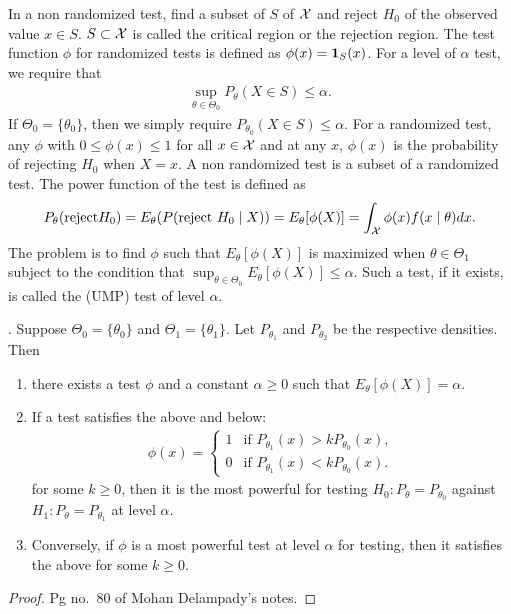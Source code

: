 In a non randomized test, find a subset of $S$ of $\mathcal{X}$ and reject $H_{0}$ of the observed value $x \in S$. $S \subset \mathcal{X}$ is called the critical region or the rejection region. The test function $\phi$ for randomized tests is defined as
$\phi(x) = \textbf{1}_{S}(x)$. For a level of $\alpha$ test, we require that
\begin{align}
    \sup_{\theta \in \Theta_{0}} P_{\theta}(X \in S) \leq \alpha.
\end{align}
If $\Theta_{0} = \{\theta_{0}\}$, then we simply require $P_{\theta_{0}}(X \in S) \leq \alpha$. For a randomized test, any $\phi$ with $0 \leq \phi(x) \leq 1$ for all $x \in \mathcal{X}$ and at any $x$, $\phi(x)$ is the probability of rejecting $H_{0}$ when $X = x$. A non randomized test is a subset of a randomized test. The power function of the test is defined as
\begin{align}
    P_{\theta}(\text{reject} H_{0}) = E_{\theta}(P(\text{reject } H_{0} \mid X)) = E_{\theta}[\phi(X)] = \int_{\mathcal{X}} \phi(x) f(x \mid \theta) dx.
\end{align}
The problem is to find $\phi$ such that $E_{\theta}[\phi(X)]$ is maximized when $\theta \in \Theta_{1}$ subject to the condition that $\sup_{\theta \in \Theta_{0}} E_{\theta}[\phi(X)] \leq \alpha$. Such a test, if it exists, is called the  (UMP) test of level $\alpha$.

\begin{lemma}
    . Suppose $\Theta_{0} = \{\theta_{0}\}$ and $\Theta_{1} = \{\theta_{1}\}$. Let $P_{\theta_{1}}$ and $P_{\theta_{2}}$ be the respective densities. Then
    \begin{enumerate}
        \item there exists a test $\phi$ and a constant $\alpha \geq 0$ such that $E_{\theta}[\phi(X)] = \alpha$.
        \item If a test satisfies the above and below:
        \begin{align}
            \phi(x) = \begin{cases}
                1 &\text{if } P_{\theta_{1}}(x) > k P_{\theta_{0}}(x), \\
                0 &\text{if } P_{\theta_{1}}(x) < k P_{\theta_{0}}(x).
            \end{cases}
        \end{align}
        for some $k \geq 0$, then it is the most powerful for testing $H_{0}:P_{\theta} = P_{\theta_{0}}$ against $H_{1}:P_{\theta} = P_{\theta_{1}}$ at level $\alpha$.

        \item Conversely, if $\phi$ is a most powerful test at level $\alpha$ for testing, then it satisfies the above for some $k \geq 0$.
    \end{enumerate}
\end{lemma}
\begin{proof}
    Pg no.~80 of Mohan Delampady's notes.
\end{proof}

